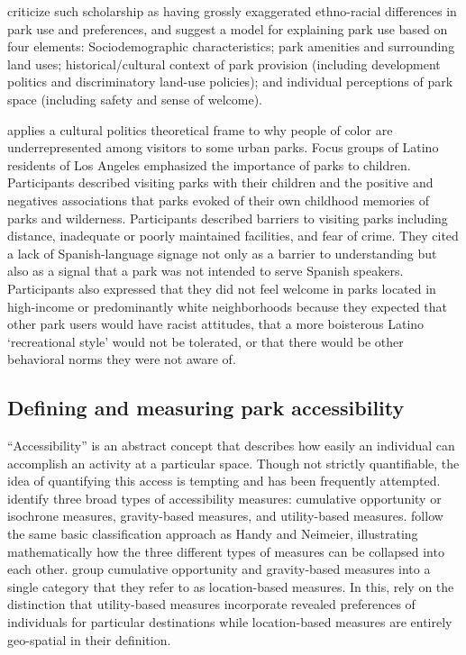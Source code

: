 \documentclass[3p, authoryear, review]{elsarticle} %
\begin{document}
\citet{byrne2009nature} criticize such scholarship as having grossly exaggerated
ethno-racial differences in park use and preferences, and suggest a model for
explaining park use based on four elements: Sociodemographic characteristics;
park amenities and surrounding land uses; historical/cultural context of park
provision (including development politics and discriminatory land-use
policies); and individual perceptions of park space (including safety and
sense of welcome).

\citet{byrne2012green} applies a cultural politics theoretical frame to why people of
color are underrepresented among visitors to some urban parks. Focus groups of
Latino residents of Los Angeles emphasized the importance of parks to
children. Participants described visiting parks with their children and the
positive and negatives associations that parks evoked of their own childhood
memories of parks and wilderness. Participants described barriers to visiting
parks including distance, inadequate or poorly maintained facilities, and fear
of crime. They cited a lack of Spanish-language signage not only as a barrier
to understanding but also as a signal that a park was not intended to serve
Spanish speakers. Participants also expressed that they did not feel welcome
in parks located in high-income or predominantly white neighborhoods because
they expected that other park users would have racist attitudes, that a more
boisterous Latino `recreational style' would not be tolerated, or that there
would be other behavioral norms they were not aware of.

\hypertarget{defining-and-measuring-park-accessibility}{%
\subsection{Defining and measuring park accessibility}\label{defining-and-measuring-park-accessibility}}

``Accessibility'' is an abstract concept that describes how easily an individual
can accomplish an activity at a particular space. Though not strictly
quantifiable, the idea of quantifying this access is tempting and has been
frequently attempted. \citet{Handy1997} identify three broad types of accessibility
measures: cumulative opportunity or isochrone measures, gravity-based measures,
and utility-based measures. \citet{Dong2006} follow the same basic classification
approach as Handy and Neimeier, illustrating mathematically how the three
different types of measures can be collapsed into each other. \citet{GEURS2004127}
group cumulative opportunity and gravity-based measures into a single category
that they refer to as location-based measures. In this, \citet{GEURS2004127} rely on
the distinction that utility-based measures incorporate revealed preferences of
individuals for particular destinations while location-based measures are
entirely geo-spatial in their definition.
\end{document}
